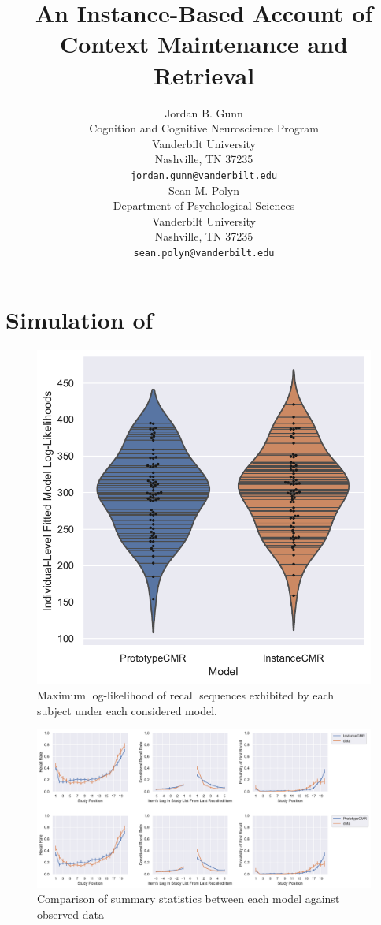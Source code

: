 \documentclass{article}
\title{An Instance-Based Account of Context Maintenance and Retrieval}
\author{
  Jordan B. Gunn \\
  Cognition and Cognitive Neuroscience Program \\
  Vanderbilt University \\
  Nashville, TN 37235 \\
  \texttt{jordan.gunn@vanderbilt.edu} \\
  \AND
  Sean M. Polyn \\
  Department of Psychological Sciences\\
  Vanderbilt University\\
  Nashville, TN 37235 \\
  \texttt{sean.polyn@vanderbilt.edu} \\
}
\begin{document}
\maketitle

\begin{abstract}
\end{abstract}







\section{Simulation of \citet{murdock1970interresponse}}

\begin{figure}[h]
  \centering
  \includegraphics[width=.5\textwidth]{individual_murdock1970.pdf}
  \caption{Maximum log-likelihood of recall sequences exhibited by each subject \citep{murdock1970interresponse} under each considered model.}
  \label{fig:MurdOkaFits}
\end{figure}

\begin{figure}[h]
  \centering
  \includegraphics[width=.9\textwidth]{overall_murdock1970.pdf}
  \caption{Comparison of summary statistics between each model against observed data \citep{murdock1970interresponse}}
  \label{fig:MurdOkaSummary}
\end{figure}
\end{document}
